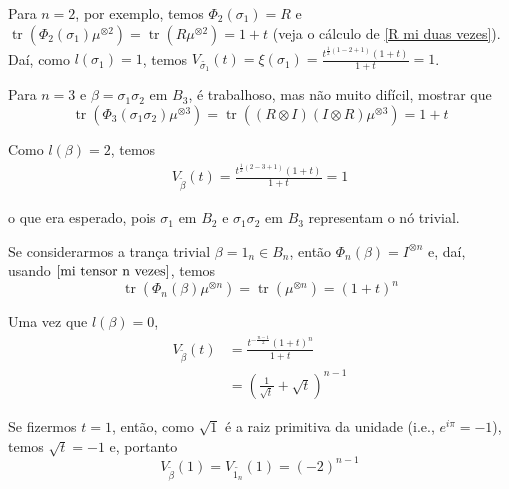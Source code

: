 \documentclass[a4paper,portuguese,11pt,twoside, leqno]{book}
\DeclareMathOperator{\tr}{tr}
\theoremstyle{definition}
\begin{document}
	\par\vspace{0.3cm} Para $n=2$, por exemplo, temos $\Phi_2(\sigma_1) = R$ e $\tr( \Phi_2(\sigma_1)\mu^{\otimes 2} ) = \tr(R\mu^{\otimes 2}) = 1+t$ (veja o cálculo de \eqref{R mi duas vezes}). Daí, como $l(\sigma_1) = 1$, temos $V_{\widetilde{\sigma_1}}(t) = \xi(\sigma_1) = \displaystyle{\frac{t^{\frac{1}{2}(1-2+1)} 
			(1+t) }{1+t}} = 1$.
	\par\vspace{0.3cm} Para $n=3$ e $\beta = \sigma_1\sigma_2$ em $B_3$, é trabalhoso, mas não muito difícil, mostrar que
	\begin{equation*}
	\tr(\Phi_3(\sigma_1\sigma_2)\mu^{\otimes 3}) = \tr( (R\otimes I)(I\otimes R) \mu^{\otimes 3} ) = 1+t
	\end{equation*} 
	\par\vspace{0.3cm} Como $l(\beta) = 2$, temos
	\begin{align*}
	V_{\widetilde{\beta}}(t) = \frac{t^{\frac{1}{2}(2-3+1)} (1+t)  }{1+t} = 1
	\end{align*}
	\par\vspace{0.3cm} o que era esperado, pois $\sigma_1$ em $B_2$ e $\sigma_1\sigma_2$ em $B_3$ representam o nó trivial.
	\par\vspace{0.3cm} Se considerarmos a trança trivial $\beta =1_n\in B_n$, então $\Phi_n(\beta) = I^{\otimes n}$ e, daí, usando $\eqref{mi tensor n vezes}$, temos
	\begin{equation*}
	\tr( \Phi_n(\beta)\mu^{\otimes n} ) = \tr(\mu^{\otimes n}) = (1+t)^n
	\end{equation*} 
	\par\vspace{0.3cm} Uma vez que $l(\beta) = 0$,
	\begin{align*}
	V_{\widetilde{\beta}}(t) &= \frac{t^{-\frac{n-1}{2}} (1+t)^n}{1+t} \\
	&= \left( \frac{1}{\sqrt{t}} + \sqrt{t} \right)^{n-1}
	\end{align*}
	\par\vspace{0.3cm} Se fizermos $t=1$, então, como $\sqrt{1}$ é a raiz primitiva da unidade (i.e., $e^{i\pi} = -1$), temos $\sqrt{t} = -1$ e, portanto
	\begin{equation}
	\label{polinomio de jones tranca trivial}
	V_{\widetilde{\beta}}(1) = V_{\widetilde{1_n}}(1) = (-2)^{n-1}
	\end{equation}
\end{document}
